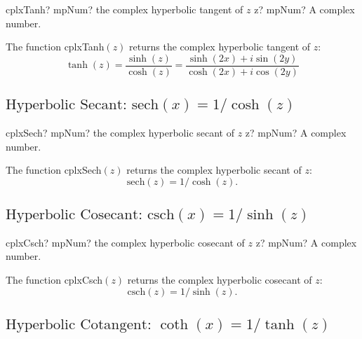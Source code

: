 \begin{mpFunctionsExtract}
	\mpFunctionOne
	{cplxTanh? mpNum? the complex hyperbolic tangent of $z$}
	{z? mpNum? A complex number.}
\end{mpFunctionsExtract}

\vspace{0.3cm}
The function \textsf{cplxTanh$(z)$} returns the complex hyperbolic tangent of $z$: 
\begin{equation}
	\tanh(z) =\frac{\sinh(z)}{\cosh(z)} = \frac{\sinh(2x)+i \sin(2y)}{\cosh(2x)+i \cos(2y)}
\end{equation}




\newpage
\subsection{\texorpdfstring{$\text{Hyperbolic Secant: sech}(x) = 1/\cosh(z)$}{sech}}

\begin{mpFunctionsExtract}
	\mpFunctionOne
	{cplxSech? mpNum? the complex hyperbolic secant of $z$}
	{z? mpNum? A complex number.}
\end{mpFunctionsExtract}

\vspace{0.3cm}
The function \textsf{cplxSech$(z)$} returns the complex hyperbolic secant of $z$: 
\begin{equation}
	\text{sech}(z) = 1/\cosh(z).
\end{equation}




\newpage
\subsection{\texorpdfstring{$\text{Hyperbolic Cosecant: csch}(x) = 1/\sinh(z)$}{csch}}

\begin{mpFunctionsExtract}
	\mpFunctionOne
	{cplxCsch? mpNum? the complex hyperbolic cosecant of $z$}
	{z? mpNum? A complex number.}
\end{mpFunctionsExtract}

\vspace{0.3cm}
The function \textsf{cplxCsch$(z)$} returns the complex hyperbolic cosecant of $z$: 
\begin{equation}
	\text{csch}(z) = 1/\sinh(z).
\end{equation}




\newpage
\subsection{\texorpdfstring{$\text{Hyperbolic Cotangent: }\coth(x) = 1/\tanh(z)$}{coth}}

